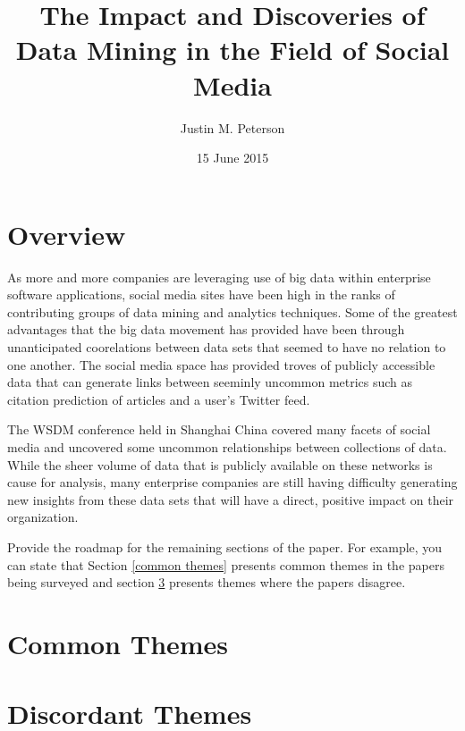 \documentclass{sig-alternate}
\begin{document}
\title{The Impact and Discoveries of Data Mining in the Field of Social Media}
\author{
\alignauthor
Justin M. Peterson
}
\date{15 June 2015}
\maketitle
\begin{abstract}
\end{abstract}

\section{Overview}
\label{overview}

As more and more companies are leveraging use of big data within
enterprise software applications, social media sites have been high in the 
ranks of contributing groups of data mining and analytics techniques. Some of the
greatest advantages that the big data movement has provided have been through
unanticipated coorelations between data sets that seemed to have no relation
to one another. The social media space has provided troves of publicly accessible 
data that can generate links between seeminly uncommon metrics such as citation prediction
of articles and a user's Twitter feed. \cite{PMC:articles/PMC3278109}

The WSDM conference held in Shanghai China \cite{DBLP:conf/wsdm/2015}
covered many facets of social media and uncovered some uncommon 
relationships between collections of data. While the sheer volume
of data that is publicly available on these networks is cause for analysis, many enterprise
companies are still having difficulty generating new insights from these data sets that
will have a direct, positive impact on their organization.  

Provide the roadmap for the remaining sections of the
paper. For example, you can state that Section \ref{common
  themes} presents common themes in the papers being
surveyed and section \ref{discordant themes} presents
themes where the papers disagree.  

\section{Common Themes}
\label{common themes}

\section{Discordant Themes}
\label{discordant themes}
\end{document}
